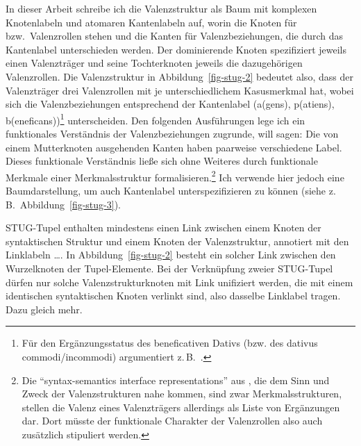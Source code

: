 In dieser Arbeit schreibe ich die Valenzstruktur als Baum mit komplexen Knotenlabeln und atomaren Kantenlabeln auf, worin die Knoten für  bzw.\ Valenzrollen stehen und die Kanten für Valenzbeziehungen, die durch das Kantenlabel unterschieden werden. Der dominierende Knoten spezifiziert jeweils einen Valenzträger und seine Tochterknoten jeweils die dazugehörigen Valenzrollen. Die Valenzstruktur in Abbildung~\ref{fig-stug-2} bedeutet also, dass der Valenzträger drei Valenzrollen mit je unterschiedlichem Kasusmerkmal hat, wobei sich die Valenzbeziehungen entsprechend der Kantenlabel ({\sc a(gens), p(atiens), b(eneficans)})\footnote{Für den Ergänzungsstatus des beneficativen Dativs (bzw. des dativus commodi/incommodi) argumentiert z.\,B.\ \citet[115]{Wegener:85}.} unterscheiden. Den folgenden Ausführungen lege ich ein funktionales Verständnis der Valenzbeziehungen zugrunde, will sagen: Die von einem Mutterknoten ausgehenden Kanten haben paarweise verschiedene Label. Dieses funktionale Verständnis lie\ss e sich ohne Weiteres durch funktionale Merkmale einer Merkmalsstruktur formalisieren.\footnote{Die "`syntax-semantics interface representations"' aus \cite{Hahn:Meurers:11}, die dem Sinn und Zweck der Valenzstrukturen nahe kommen, sind zwar Merkmalsstrukturen, stellen die Valenz eines Valenzträgers allerdings als Liste von Ergänzungen dar. Dort müsste der funktionale Charakter der Valenzrollen also auch zusätzlich stipuliert werden.} Ich verwende hier jedoch eine Baumdarstellung, um auch Kantenlabel unterspezifizieren zu können (siehe z.\,B.\ Abbildung~\ref{fig-stug-3}).

STUG-Tupel enthalten mindestens einen Link zwischen einem Knoten der syntaktischen Struktur und einem Knoten der Valenzstruktur, annotiert mit den Linklabeln  \ldots {}. In Abbildung~\ref{fig-stug-2} besteht ein solcher Link zwischen den Wurzelknoten der Tupel-Elemente. Bei der Verknüpfung zweier STUG-Tupel dürfen nur solche Valenzstrukturknoten mit Link unifiziert werden, die mit einem identischen syntaktischen Knoten verlinkt sind, also dasselbe Linklabel tragen. Dazu gleich mehr. 

